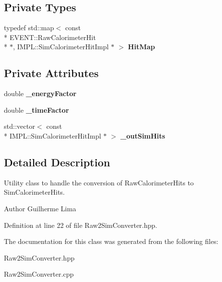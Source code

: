 \subsection*{Private Types}
\begin{DoxyCompactItemize}
\item 
typedef std\-::map$<$ const \\*
E\-V\-E\-N\-T\-::\-Raw\-Calorimeter\-Hit \\*
$\ast$, I\-M\-P\-L\-::\-Sim\-Calorimeter\-Hit\-Impl $\ast$ $>$ {\bfseries Hit\-Map}\label{classdigisim_1_1Raw2SimConverter_ab7849e5504e56b9de9e197bc2c6302d1}

\end{DoxyCompactItemize}
\subsection*{Private Attributes}
\begin{DoxyCompactItemize}
\item 
double {\bfseries \-\_\-energy\-Factor}\label{classdigisim_1_1Raw2SimConverter_a929259f124928c57f1ea3e0c9959d793}

\item 
double {\bfseries \-\_\-time\-Factor}\label{classdigisim_1_1Raw2SimConverter_a3e550984ccc24b0bffdf2d970206f8c2}

\item 
std\-::vector$<$ const \\*
I\-M\-P\-L\-::\-Sim\-Calorimeter\-Hit\-Impl $\ast$ $>$ {\bfseries \-\_\-out\-Sim\-Hits}\label{classdigisim_1_1Raw2SimConverter_a39264bb7f024834813c10ff25f32928e}

\end{DoxyCompactItemize}


\subsection{Detailed Description}
Utility class to handle the conversion of Raw\-Calorimeter\-Hits to Sim\-Calorimeter\-Hits. 

\begin{DoxyAuthor}{Author}
Guilherme Lima 
\end{DoxyAuthor}


Definition at line 22 of file Raw2\-Sim\-Converter.\-hpp.



The documentation for this class was generated from the following files\-:\begin{DoxyCompactItemize}
\item 
Raw2\-Sim\-Converter.\-hpp\item 
Raw2\-Sim\-Converter.\-cpp\end{DoxyCompactItemize}
